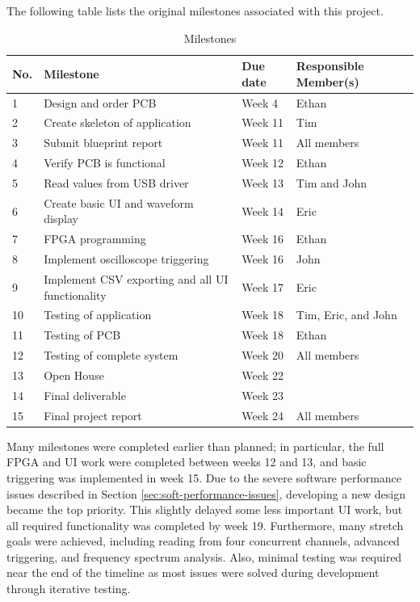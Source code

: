 \documentclass[letterpaper,11pt]{article}
\begin{document}
The following table lists the original milestones associated with this project.
\begin{table}[H]
    \caption{Milestones}
    \begin{tabularx}{\textwidth}{l|l|l|l}
        No. & Milestone & Due date & Responsible Member(s) \\
        \hline
        1 & Design and order PCB & Week 4 & Ethan \\
        2 & Create skeleton of application & Week 11 & Tim \\
        3 & Submit blueprint report & Week 11 & All members \\
        4 & Verify PCB is functional & Week 12 & Ethan \\
        5 & Read values from USB driver & Week 13 & Tim and John \\
        6 & Create basic UI and waveform display & Week 14 & Eric \\
        7 & FPGA programming & Week 16 & Ethan \\
        8 & Implement oscilloscope triggering & Week 16 & John \\
        9 & Implement CSV exporting and all UI functionality & Week 17 & Eric \\
        10 & Testing of application & Week 18 & Tim, Eric, and John \\
        11 & Testing of PCB & Week 18 & Ethan \\
        12 & Testing of complete system & Week 20 & All members \\
        13 & Open House & Week 22 & \\
        14 & Final deliverable & Week 23 & \\
        15 & Final project report & Week 24 & All members
    \end{tabularx} 
\label{hw:milestones-table}
\end{table}

Many milestones were completed earlier than planned; in particular, the full FPGA
and UI work were completed between weeks 12 and 13, and basic triggering was
implemented in week 15. Due to the severe software performance issues described in
Section \ref{sec:soft-performance-issues}, developing a new design became the top priority.
This slightly delayed some less important UI work, but all required functionality was
completed by week 19. Furthermore, many stretch goals were achieved, including
reading from four concurrent channels, advanced triggering, and frequency spectrum
analysis. Also, minimal testing was required near the end of the timeline as most
issues were solved during development through iterative testing.
\end{document}
